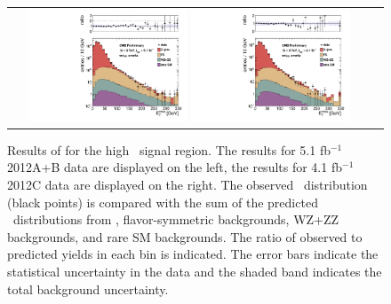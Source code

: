 \begin{figure}[!h]
\begin{center}
\begin{tabular}{cc}
\includegraphics[width=0.45\textwidth]{plots/pfmet_pt40_2012AB_highMet_all.pdf}
\includegraphics[width=0.45\textwidth]{plots/pfmet_pt40_2012C_highMet_all.pdf}
\end{tabular}
\caption{\footnotesize Results of for the high \MET\ signal region. 
The results for 5.1 fb$^{-1}$ 2012A+B data are displayed on the left, the results for 4.1 fb$^{-1}$ 2012C data are displayed on the right. 
The observed \MET\ distribution (black points) is compared with the sum of the predicted \MET\
distributions from \zjets, flavor-symmetric backgrounds, WZ+ZZ backgrounds, and rare SM backgrounds. 
The ratio of observed to predicted yields in each bin is
indicated. The error bars indicate the statistical uncertainty in the data and the shaded band indicates the total background uncertainty.
\label{fig:results_highmet}
}
\end{center}
\end{figure}

